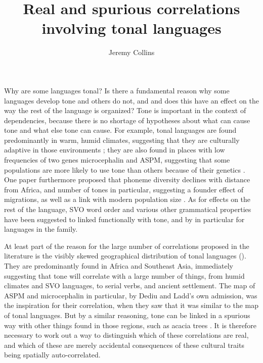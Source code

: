 \documentclass[output=paper]{langsci/langscibook}
\author{Jeremy Collins\affiliation{Radboud University, Nijmegen}}
\title{Real and spurious correlations involving tonal languages}
\begin{document}
  \noindent Why are some languages tonal?  Is there a fundamental reason why some languages develop tone and others do not, and and does this have an effect on the way the rest of the language is organized?  Tone is important in the context of dependencies, because there is no shortage of hypotheses about what can cause tone and what else tone can cause.  For example, tonal languages are found predominantly in warm, humid climates, suggesting that they are culturally adaptive in those environments \citep{Everett2015}; they are also found in places with low frequencies of two genes microcephalin and ASPM, suggesting that some populations are more likely to use tone than others because of their genetics \citep{Dediu2007}.  One paper furthermore proposed that phoneme diversity declines with distance from Africa, and number of tones in particular, suggesting a founder effect of migrations, as well as a link with modern population size \citep{Atkinson2011}.  As for effects on the rest of the language, SVO word order \citep{Yiu2013} and various other grammatical  properties have been suggested to linked functionally with tone, and by \citet{Donegan1983} in particular for languages in the  family.




   At least part of the reason for the large number of correlations proposed in the literature is the visibly skewed geographical distribution of tonal languages (). They are predominantly found in Africa and Southeast Asia, immediately suggesting that tone will correlate with a large number of things, from humid climates and SVO languages, to serial verbs, and ancient settlement.  The map of ASPM and microcephalin in particular, by Dediu and Ladd’s own admission, was the inspiration for their correlation, when they saw that it was similar to the map of tonal languages.  But by a similar reasoning, tone can be linked in a spurious way with other things found in those regions, such as acacia trees \citep{Roberts2013}.  It is therefore necessary to work out a way to distinguish which of these correlations are real, and which of these are merely accidental consequences of these cultural traits being spatially auto-correlated.  
\end{document}
